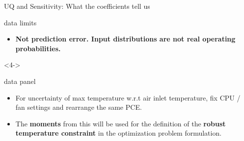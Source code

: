 \begin{frame}{UQ and Sensitivity: What the coefficients tell us}
\begin{uncoverenv}
\begin{beamercolorbox}[sep=1.5mm,wd=\textwidth]{data limits}
    \small
    \setlength{\topsep}{0pt}
    \setlength{\partopsep}{0pt}
    \vspace{-2mm}
    \begin{itemize}
      \item \textbf{Not prediction error. Input distributions are not real operating probabilities.}
    \end{itemize}
    \vspace{-1mm}
  \end{beamercolorbox}
  \end{uncoverenv}
  \par\vspace{1mm}
  \begin{uncoverenv}<4->
  \begin{beamercolorbox}[sep=1.5mm,wd=\textwidth]{data panel}
    \small
    \setlength{\topsep}{0pt}
    \setlength{\partopsep}{0pt}
    \vspace{-2mm}
    \begin{itemize}
      \setlength{\itemsep}{1pt}
      \item For uncertainty of max temperature w.r.t air inlet temperature, fix CPU / fan settings and rearrange the same PCE.
      \item[$\rightarrow$] The \textbf{moments} from this will be used for the definition of the \textbf{robust temperature constraint} in the optimization problem formulation.
    \end{itemize}
    \vspace{-1mm}
  \end{beamercolorbox}
  \end{uncoverenv}
\end{frame}

